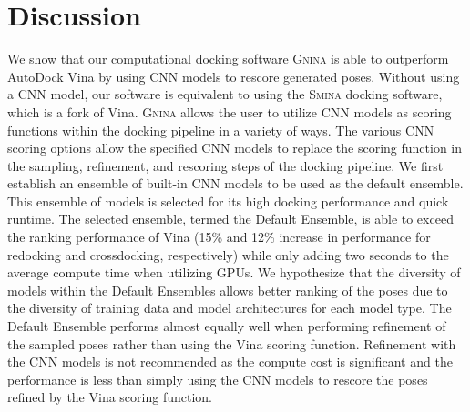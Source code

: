 \documentclass[journal=jcisd8,manuscript=article]{achemso}
\begin{document}
\section{Discussion}
We show that our computational docking software \textsc{Gnina} is able to outperform AutoDock Vina by using CNN models to rescore generated poses. Without using a CNN model, our software is equivalent to using the \textsc{Smina} docking software, which is a fork of Vina. \textsc{Gnina} allows the user to utilize CNN models as scoring functions within the docking pipeline in a variety of ways. The various CNN scoring options allow the specified CNN models to replace the scoring function in the sampling, refinement, and rescoring steps of the docking pipeline. We first establish an ensemble of built-in CNN models to be used as the default ensemble. This ensemble of models is selected for its high docking performance and quick runtime. The selected ensemble, termed the Default Ensemble, is able to exceed the ranking performance of Vina (15\% and 12\% increase in performance for redocking and crossdocking, respectively) while only adding two seconds to the average compute time when utilizing GPUs. We hypothesize that the diversity of models within the Default Ensembles allows better ranking of the poses due to the diversity of training data and model architectures for each model type. The Default Ensemble performs almost equally well when performing refinement of the sampled poses rather than using the Vina scoring function. Refinement with the CNN models is not recommended as the compute cost is significant and the performance is less than simply using the CNN models to rescore the poses refined by the Vina scoring function.
\end{document}
